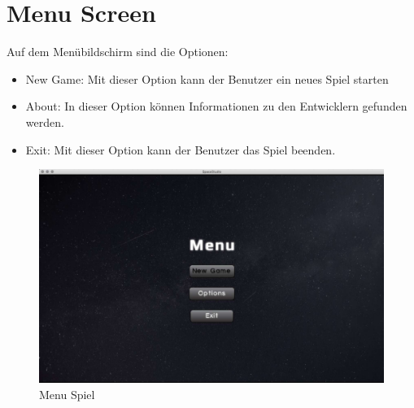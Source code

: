 \documentclass[12pt]{article}
\begin{document}
\section{Menu Screen}
Auf dem Menübildschirm sind die Optionen:
\begin{itemize}
\item New Game: Mit dieser Option kann der Benutzer ein neues Spiel starten
\item About: In dieser Option können Informationen zu den Entwicklern gefunden werden.
\item Exit: Mit dieser Option kann der Benutzer das Spiel beenden.
\end{itemize}
\begin{figure}[htp]
\centering
\includegraphics[scale=0.4]{TestProtocolBilder/menuScreen.jpg}
\caption{Menu Spiel}
\end{figure}
\newpage
\end{document}
